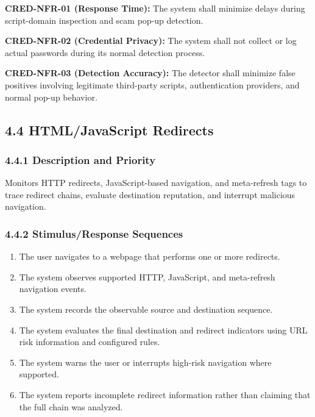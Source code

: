 \documentclass[12pt,a4paper]{report}
\let\originaladdcontentsline\addcontentsline
\renewcommand{\addcontentsline}[3]{\phantomsection\originaladdcontentsline{#1}{#2}{#3}}
\begin{document}
\textbf{CRED-NFR-01 (Response Time):} The system shall minimize delays during script-domain inspection and scam pop-up detection.\par

\textbf{CRED-NFR-02 (Credential Privacy):} The system shall not collect or log actual passwords during its normal detection process.\par

\textbf{CRED-NFR-03 (Detection Accuracy):} The detector shall minimize false positives involving legitimate third-party scripts, authentication providers, and normal pop-up behavior.\par

\subsection*{4.4 HTML/JavaScript Redirects}

\subsubsection*{4.4.1 Description and Priority}

Monitors HTTP redirects, JavaScript-based navigation, and meta-refresh tags to trace redirect chains, evaluate destination reputation, and interrupt malicious navigation.\par

\subsubsection*{4.4.2 Stimulus/Response Sequences}

\begin{enumerate}
\item The user navigates to a webpage that performs one or more redirects.
\item The system observes supported HTTP, JavaScript, and meta-refresh navigation events.
\item The system records the observable source and destination sequence.
\item The system evaluates the final destination and redirect indicators using URL risk information and configured rules.
\item The system warns the user or interrupts high-risk navigation where supported.
\item The system reports incomplete redirect information rather than claiming that the full chain was analyzed.
\end{enumerate}
\end{document}

